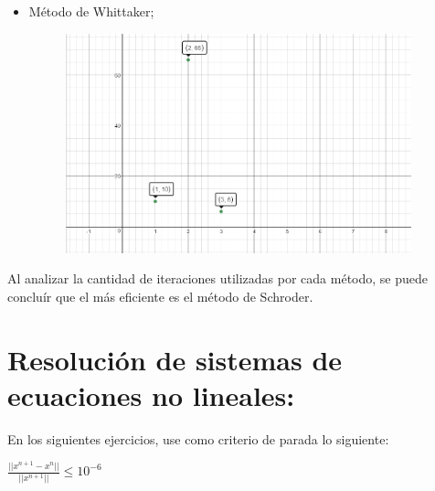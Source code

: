 \documentclass{udpreport}
\begin{document}
\begin{enumerate}
\begin{enumerate}
\begin{itemize}
				 
				 \item Método de Whittaker;
				 \begin{figure}[H]
					\centering
						\includegraphics[width=10cm]{WhittakerEj6} 
				\end{figure}	
			\end{itemize}
			
			Al analizar la cantidad de iteraciones utilizadas por cada método, se puede concluír que el más eficiente es el método de Schroder.
        \end{enumerate}
\end{enumerate}
\newpage
\chapter{Resolución de sistemas de ecuaciones no lineales:}
    
        
        En los siguientes ejercicios, use como criterio de parada lo siguiente:
        \begin{center}
            $ \frac{|| x^{n+1} - x^{n} ||}{|| x^{n+1} ||} \leq 10^{-6} $  
        \end{center}
\end{document}
